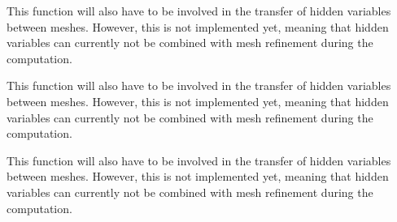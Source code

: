 \begin{DoxyRefList}
\item[\label{todo__todo000012}%
\hypertarget{todo__todo000012}{}%
Member \hyperlink{class_triangulation_system_a62be2563cc8d810a71941e15490f9840}{Triangulation\+System$<$ spacedim $>$\+:\+:execute\+\_\+coarsening\+\_\+and\+\_\+refinement} ()]This function will also have to be involved in the transfer of hidden variables between meshes. However, this is not implemented yet, meaning that hidden variables can currently not be combined with mesh refinement during the computation.  
\item[\label{todo__todo000011}%
\hypertarget{todo__todo000011}{}%
Member \hyperlink{class_triangulation_system_a8435489384095f687363d200ccfce628}{Triangulation\+System$<$ spacedim $>$\+:\+:post\+\_\+refinement\+\_\+domain} ()]This function will also have to be involved in the transfer of hidden variables between meshes. However, this is not implemented yet, meaning that hidden variables can currently not be combined with mesh refinement during the computation.  
\item[\label{todo__todo000010}%
\hypertarget{todo__todo000010}{}%
Member \hyperlink{class_triangulation_system_ae1862e6da3157dc8d539fdc0439e9f48}{Triangulation\+System$<$ spacedim $>$\+:\+:pre\+\_\+refinement\+\_\+domain} ()]This function will also have to be involved in the transfer of hidden variables between meshes. However, this is not implemented yet, meaning that hidden variables can currently not be combined with mesh refinement during the computation. 
\end{DoxyRefList}